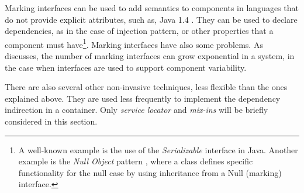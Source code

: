 \begin{dinglist}{43}
Marking interfaces can be used to add semantics to components in languages that do not provide explicit attributes, such as, Java 1.4 \cite{www.java,java.attrib4j}. They can be used to declare dependencies, as in the case of injection pattern, or other properties that a component must have\footnote{A well-known example is the use of the \textit{Se\-ria\-li\-zable} interface in Java. Another example is the \textit{Null Object} pattern \cite{refactor.99}, where a class defines specific functionality for the null case by using inheritance from a Null (marking) interface.}. Marking interfaces have also some problems. As  discusses, the number of marking interfaces can grow exponential in a system, in the case when interfaces are used to support component variability.

\end{dinglist}

There are also several other non-invasive techniques, less flexible than the ones explained above. They are used less frequently to implement the dependency indirection in a container. Only \textit{service locator} \cite{fowler.ioc.04,j2ee.without.ejb.04} and \textit{mix-ins} \cite{bracha90mixinbased,Ernst.99,flatt98classes,Duggan.00} will be briefly considered in this section.

